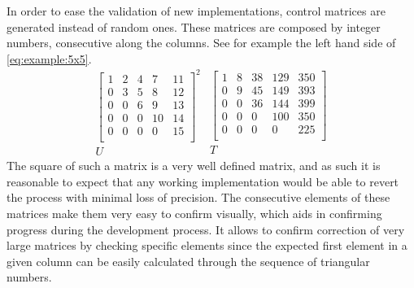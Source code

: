 \documentclass[../thesis]{subfiles}
\begin{document}
		In order to ease the validation of new implementations, control matrices are generated instead of random ones. These matrices are composed by integer numbers, consecutive along the columns. See for example the left hand side of \cref{eq:example:5x5}. 
		\begin{equation}
			\begin{array}{c}
				\begin{bmatrix}
					 1 &  2 &  4 &  7 & 11  \\
					 0 &  3 &  5 &  8 & 12  \\
					 0 &  0 &  6 &  9 & 13  \\
					 0 &  0 &  0 & 10 & 14  \\
					 0 &  0 &  0 &  0 & 15  \\
				\end{bmatrix}^2  \\
				U
			\end{array}
			\begin{array}{c}
				\begin{bmatrix}
					  1 &   8 &  38 & 129 & 350  \\
					  0 &   9 &  45 & 149 & 393  \\
					  0 &   0 &  36 & 144 & 399  \\
					  0 &   0 &   0 & 100 & 350  \\
					  0 &   0 &   0 &   0 & 225  \\
				\end{bmatrix}  \\
				T
			\end{array}
			\label{eq:example:5x5}
		\end{equation} The square of such a matrix is a very well defined matrix, and as such it is reasonable to expect that any working implementation would be able to revert the process with minimal loss of precision. The consecutive elements of these matrices make them very easy to confirm visually, which aids in confirming progress during the development process. It allows to confirm correction of very large matrices by checking specific elements since the expected first element in a given column can be easily calculated through the sequence of triangular numbers.
\end{document}
